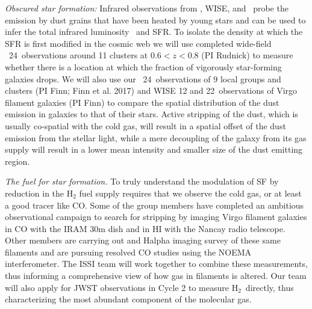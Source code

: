 \documentclass[11pt]{article}
\begin{document}
\textit{Obscured star formation:} Infrared observations from
\spitzer, WISE, and \herschel\ probe the emission by dust grains that have
been heated by young stars and can be used to infer the total
infrared luminosity \lir\ and SFR.  
To isolate the density at which the SFR is first modified in the cosmic web we will use completed wide-field
\spitzer\ 24\micron\ observations around 11 clusters at $0.6<z<0.8$
(PI Rudnick) to measure whether there is a location at which the
fraction of vigorously star-forming galaxies drops.  We will also use our
\spitzer\ 24\micron\ observations of 9 local groups and clusters (PI Finn; Finn et al. 2017) and WISE 12 and 22\micron\ observations of Virgo filament galaxies (PI Finn) to
compare the spatial distribution of the dust emission in galaxies to
that of their stars.  Active stripping of the dust, which is usually co-spatial with the cold gas, will
result in a spatial offset of the dust emission from the stellar
light, while a mere decoupling of the galaxy from its gas supply will
result in a lower mean intensity and smaller  size of the dust emitting region.

\textit{The fuel for star formation.} To truly understand the
modulation of SF by reduction in the H$_2$ fuel supply
requires that we observe the cold gas, or at least a good tracer like CO.  
Some of the group members have completed an ambitious observational campaign to search for stripping by imaging Virgo filament galaxies in CO with the IRAM 30m dish and in HI with the Nancay radio telescope.   Other members are carrying out and Halpha imaging survey of these same filaments and are pursuing resolved CO studies using the NOEMA interferometer.  The ISSI team will work together to combine these measurements, thus informing a comprehensive view of how gas in filaments is altered.  Our team will also apply for JWST observations in Cycle 2 to measure H$_2$~directly, thus characterizing the most abundant component of the molecular gas.
\end{document}

